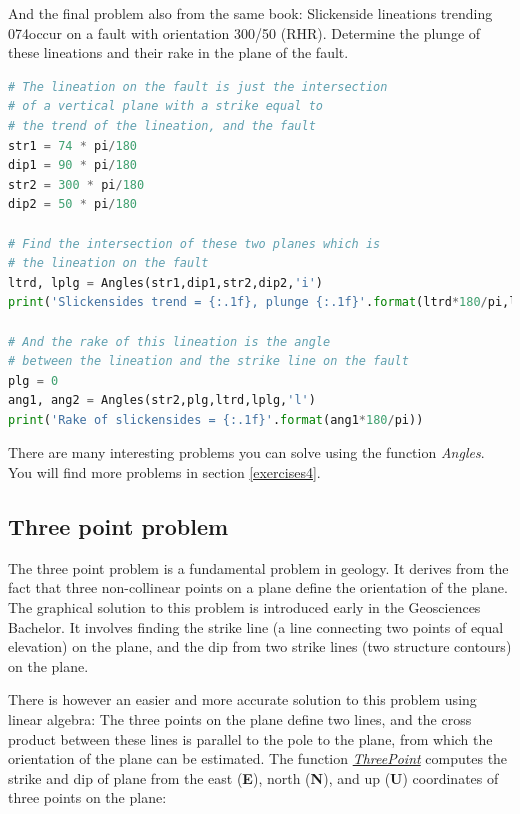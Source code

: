 \documentclass[a4paper , 12pt]{book}
\begin{document}
And the final problem also from the same book: Slickenside lineations trending 074\degree occur on a fault with orientation 300/50 (RHR). Determine the plunge of these lineations and their rake in the plane of the fault.

\begin{center}
\begin{lstlisting}[language=Python, frame=single]
# The lineation on the fault is just the intersection
# of a vertical plane with a strike equal to
# the trend of the lineation, and the fault
str1 = 74 * pi/180
dip1 = 90 * pi/180
str2 = 300 * pi/180
dip2 = 50 * pi/180

# Find the intersection of these two planes which is
# the lineation on the fault
ltrd, lplg = Angles(str1,dip1,str2,dip2,'i')
print('Slickensides trend = {:.1f}, plunge {:.1f}'.format(ltrd*180/pi,lplg*180/pi))

# And the rake of this lineation is the angle
# between the lineation and the strike line on the fault
plg = 0
ang1, ang2 = Angles(str2,plg,ltrd,lplg,'l')
print('Rake of slickensides = {:.1f}'.format(ang1*180/pi))
\end{lstlisting}
\end{center}

There are many interesting problems you can solve using the function \textit{Angles}. You will find more problems in section \ref{exercises4}.

\subsection{Three point problem}

The three point problem is a fundamental problem in geology. It derives from the fact that three non-collinear points on a plane define the orientation of the plane. The graphical solution to this problem is introduced early in the Geosciences Bachelor. It involves finding the strike line (a line connecting two points of equal elevation) on the plane, and the dip from two strike lines (two structure contours) on the plane. 

There is however an easier and more accurate solution to this problem using linear algebra: The three points on the plane define two lines, and the cross product between these lines is parallel to the pole to the plane, from which the orientation of the plane can be estimated. The function \href{https://github.com/nfcd/compGeo/blob/master/source/functions/ThreePoint.py}{\textit{ThreePoint}} computes the strike and dip of plane from the east (\textbf{E}), north (\textbf{N}), and up (\textbf{U}) coordinates of three points on the plane:
\end{document}
